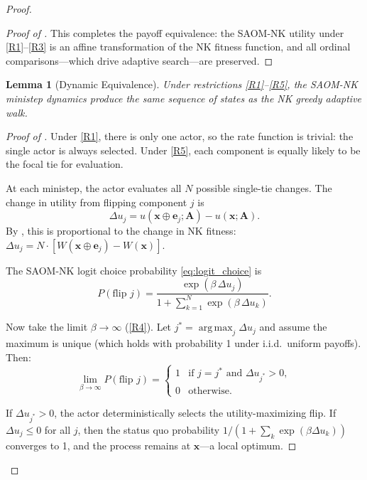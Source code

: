 \documentclass[12pt]{article}
\newtheorem{lemma}{Lemma}
\DeclareMathOperator*{\argmax}{arg\,max}
\newcommand{\bx}{\mathbf{x}}
\newcommand{\be}{\mathbf{e}}
\newcommand{\bA}{\mathbf{A}}
\begin{document}
\begin{proof}
\begin{proof}[Proof of ]
This completes the payoff equivalence: the SAOM-NK utility under
\ref{R1}--\ref{R3} is an affine transformation of the NK fitness function, and
all ordinal comparisons---which drive adaptive search---are preserved.
\end{proof}

\begin{lemma}[Dynamic Equivalence]
\label{lem:dynamic_equiv}
Under restrictions \ref{R1}--\ref{R5}, the SAOM-NK ministep dynamics produce the
same sequence of states as the NK greedy adaptive walk.
\end{lemma}

\begin{proof}[Proof of ]
Under \ref{R1}, there is only one actor, so the rate function is trivial: the
single actor is always selected. Under \ref{R5}, each component is equally
likely to be the focal tie for evaluation.

At each ministep, the actor evaluates all $N$ possible single-tie changes.
The change in utility from flipping component $j$ is
\begin{equation*}
  \Delta u_j = u(\bx \oplus \be_j; \bA) - u(\bx; \bA).
\end{equation*}
By , this is proportional to the change in NK fitness:
$\Delta u_j = N \cdot [W(\bx \oplus \be_j) - W(\bx)]$.

The SAOM-NK logit choice probability \eqref{eq:logit_choice} is
\begin{equation*}
  P(\text{flip } j) = \frac{\exp(\beta \, \Delta u_j)}{1 + \sum_{k=1}^{N} \exp(\beta \, \Delta u_k)}.
\end{equation*}

Now take the limit $\beta \to \infty$ (\ref{R4}). Let
$j^* = \argmax_{j} \Delta u_j$ and assume the maximum is unique (which holds
with probability 1 under i.i.d.\ uniform payoffs). Then:
\begin{equation*}
  \lim_{\beta \to \infty} P(\text{flip } j)
  = \begin{cases}
    1 & \text{if } j = j^* \text{ and } \Delta u_{j^*} > 0, \\
    0 & \text{otherwise}.
  \end{cases}
\end{equation*}

If $\Delta u_{j^*} > 0$, the actor deterministically selects the utility-maximizing
flip. If $\Delta u_j \leq 0$ for all $j$, then the status quo probability
$1/(1 + \sum_k \exp(\beta \Delta u_k))$ converges to 1, and the process remains
at $\bx$---a local optimum.


\end{proof}
\end{proof}
\end{document}
